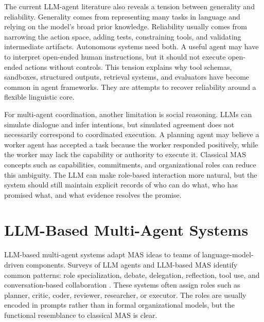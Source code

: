 The current LLM-agent literature also reveals a tension between generality and reliability. Generality comes from representing many tasks in language and relying on the model's broad prior knowledge. Reliability usually comes from narrowing the action space, adding tests, constraining tools, and validating intermediate artifacts. Autonomous systems need both. A useful agent may have to interpret open-ended human instructions, but it should not execute open-ended actions without controls. This tension explains why tool schemas, sandboxes, structured outputs, retrieval systems, and evaluators have become common in agent frameworks. They are attempts to recover reliability around a flexible linguistic core.

For multi-agent coordination, another limitation is social reasoning. LLMs can simulate dialogue and infer intentions, but simulated agreement does not necessarily correspond to coordinated execution. A planning agent may believe a worker agent has accepted a task because the worker responded positively, while the worker may lack the capability or authority to execute it. Classical MAS concepts such as capabilities, commitments, and organizational roles can reduce this ambiguity. The LLM can make role-based interaction more natural, but the system should still maintain explicit records of who can do what, who has promised what, and what evidence resolves the promise.

\section{LLM-Based Multi-Agent Systems}

LLM-based multi-agent systems adapt MAS ideas to teams of language-model-driven components. Surveys of LLM agents and LLM-based MAS identify common patterns: role specialization, debate, delegation, reflection, tool use, and conversation-based collaboration \cite{wang2024survey,guo2024llmmas,tran2025multiagent}. These systems often assign roles such as planner, critic, coder, reviewer, researcher, or executor. The roles are usually encoded in prompts rather than in formal organizational models, but the functional resemblance to classical MAS is clear.

